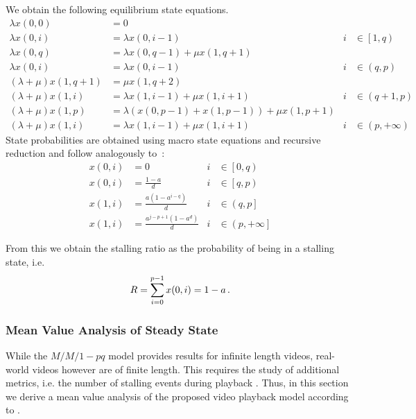 We obtain the following equilibrium state equations.
\begin{align*}
  \lambda x(0, 0) &= 0 & &\\
  \lambda x(0, i) &= \lambda x(0, i-1) & i&\in \left[1, q\right)\\
  \lambda x(0, q) &= \lambda x(0, q-1) + \mu x(1, q+1) & &\\
  \lambda x(0, i) &= \lambda x(0, i-1) & i&\in\left(q, p\right)\\
  (\lambda + \mu) x(1, q+1) &= \mu x(1, q+2) & &\\
  (\lambda + \mu) x(1, i) &= \lambda x(1, i-1) + \mu x(1, i+1) & i&\in\left(q+1, p\right)\\
  (\lambda + \mu) x(1, p) &= \lambda (x(0,p-1) + x(1, p-1)) + \mu x(1, p+1) & &\\
  (\lambda + \mu) x(1, i) &= \lambda x(1, i-1) + \mu x(1, i+1) & i&\in\left(p, +\infty\right)
\end{align*}
State probabilities are obtained using macro state equations and recursive reduction and follow analogously to~\cite{Zhang2004}:
\begin{align*}
x(0, i) &= 0 & i&\in \left[0,q\right)\\ 
x(0, i) &= \frac{1-a}{d} &i&\in \left[q,p\right)\\
x(1, i) &= \frac{a(1- a^{i-q})}{d} &i&\in \left(q,p\right]\\
x(1, i) &= \frac{a^{j-p+1}(1-a^{d})}{d} &i&\in \left(p,+\infty\right]
\end{align*}

From this we obtain the stalling ratio \stallingRatio as the probability of being in a stalling state, i.e.
\begin{equation}
R = \sum_{i=0}^{p-1} x(0, i) = 1-a \, .
\label{eq:application:qoe_user_behaviour:system_model:mm1pq:stalling_ratio_queuing}
\end{equation}

\subsubsection*{Mean Value Analysis of Steady State}\label{sec:application:qoe_user_behaviour:system_model:steady_state}
While the \(M/M/1-pq\) model provides results for infinite length videos, real-world videos however are of finite length.
This requires the study of additional metrics, i.e. the number of stalling events during playback \numberStallingEvents.
Thus, in this section we derive a mean value analysis of the proposed video playback model according to .

